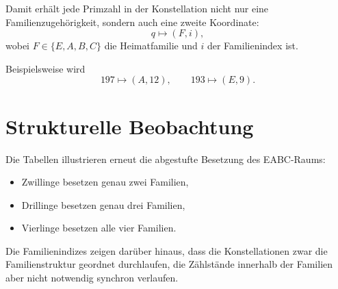 \documentclass[11pt,a4paper]{article}
\theoremstyle{plain}
\theoremstyle{definition}
\theoremstyle{remark}
\begin{document}
	Damit erhält jede Primzahl in der Konstellation nicht nur eine Familienzugehörigkeit, sondern auch eine zweite Koordinate:
	\[
	q \longmapsto (F,i),
	\]
	wobei \(F\in\{E,A,B,C\}\) die Heimatfamilie und \(i\) der Familienindex ist.
	
	Beispielsweise wird
	\[
	197 \longmapsto (A,12),\qquad 193 \longmapsto (E,9).
	\]
	
	\section{Strukturelle Beobachtung}
	
	Die Tabellen illustrieren erneut die abgestufte Besetzung des EABC-Raums:
	
	\begin{itemize}
		\item Zwillinge besetzen genau zwei Familien,
		\item Drillinge besetzen genau drei Familien,
		\item Vierlinge besetzen alle vier Familien.
	\end{itemize}
	
	Die Familienindizes zeigen darüber hinaus, dass die Konstellationen zwar die Familienstruktur geordnet durchlaufen, die Zählstände innerhalb der Familien aber nicht notwendig synchron verlaufen.
	
\end{document}

